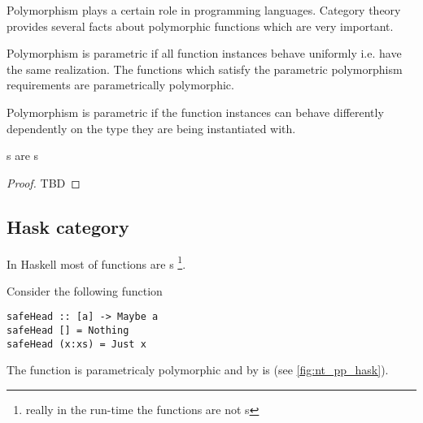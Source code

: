 \begin{definition}
Polymorphism plays a certain role in programming languages. Category
theory provides several facts about polymorphic functions which are
very important.

\begin{definition}
\label{def:pp_function}
Polymorphism is parametric if all function instances behave uniformly
i.e. have the same realization. The functions which satisfy the
parametric polymorphism requirements are parametrically polymorphic.
\end{definition}

\begin{definition}
\label{def:ad_hoc_polymorphism}
Polymorphism is parametric if the function instances can behave
differently dependently on the type they are being instantiated with. 
\end{definition}

\begin{theorem}[Reynolds]
\label{thm:reynolds}
s are s 
\begin{proof}
TBD
\end{proof}
\end{theorem}

\subsection{\textbf{Hask} category}

In Haskell most of functions are s 
\footnote{really in the run-time the functions are not
  s}.  

\begin{example}
\label{ex:nt_hask}
Consider the following function
\begin{verbatim}
safeHead :: [a] -> Maybe a
safeHead [] = Nothing
safeHead (x:xs) = Just x
\end{verbatim}
The function is parametricaly polymorphic and by
 is  (see \cref{fig:nt_pp_hask}).

\begin{figure}
  \centering
  \begin{tikzpicture}[ele/.style={fill=black,circle,minimum
        width=.8pt,inner sep=1pt},every fit/.style={ellipse,draw,inner
        sep=-2pt}]



\end{tikzpicture}
\end{figure}
\end{example}
\end{definition}

